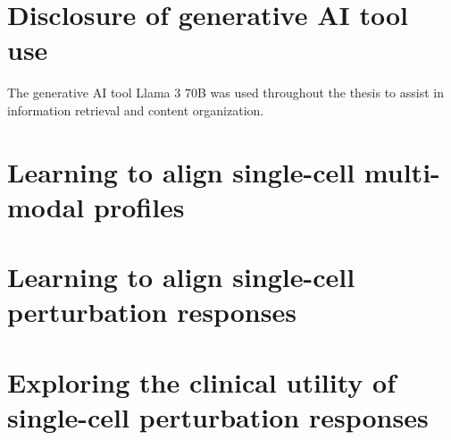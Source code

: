 \documentclass[12pt,a4paper,twoside,english,final]{ETHthesis}
\begin{document}
\section{Disclosure of generative AI tool use}
The generative AI tool Llama 3 70B \cite{llama3} was used throughout the thesis to assist in information retrieval and content organization.

\section{Learning to align single-cell multi-modal profiles}

\cleardoublepageempty{}

\section{Learning to align single-cell perturbation responses}

\cleardoublepageempty{}

\section{Exploring the clinical utility of single-cell perturbation responses}

\cleardoublepageempty{}


\listoftables{}
\cleardoublepageempty{}
{}
\listoffigures{}
\cleardoublepageempty{}
\cleardoublepageempty{}


\let\l\relax
{}
\printbibliography{}
\cleardoublepageempty{}
\clearpage
\cleardoublepageempty{}
\end{document}
